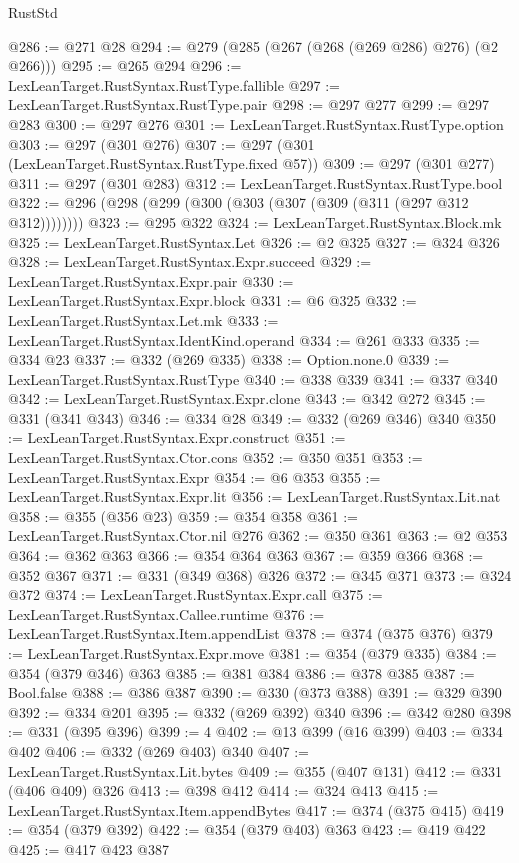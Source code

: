 \begin{lexlean}{RustStd}
\begin{coremodule}
@286 := @271 @28
@294 := @279 (@285 (@267 (@268 (@269 @286) @276) (@2 @266)))
@295 := @265 @294
@296 := LexLeanTarget.RustSyntax.RustType.fallible
@297 := LexLeanTarget.RustSyntax.RustType.pair
@298 := @297 @277
@299 := @297 @283
@300 := @297 @276
@301 := LexLeanTarget.RustSyntax.RustType.option
@303 := @297 (@301 @276)
@307 := @297 (@301 (LexLeanTarget.RustSyntax.RustType.fixed @57))
@309 := @297 (@301 @277)
@311 := @297 (@301 @283)
@312 := LexLeanTarget.RustSyntax.RustType.bool
@322 := @296 (@298 (@299 (@300 (@303 (@307 (@309 (@311 (@297 @312 @312))))))))
@323 := @295 @322
@324 := LexLeanTarget.RustSyntax.Block.mk
@325 := LexLeanTarget.RustSyntax.Let
@326 := @2 @325
@327 := @324 @326
@328 := LexLeanTarget.RustSyntax.Expr.succeed
@329 := LexLeanTarget.RustSyntax.Expr.pair
@330 := LexLeanTarget.RustSyntax.Expr.block
@331 := @6 @325
@332 := LexLeanTarget.RustSyntax.Let.mk
@333 := LexLeanTarget.RustSyntax.IdentKind.operand
@334 := @261 @333
@335 := @334 @23
@337 := @332 (@269 @335)
@338 := Option.none.{0}
@339 := LexLeanTarget.RustSyntax.RustType
@340 := @338 @339
@341 := @337 @340
@342 := LexLeanTarget.RustSyntax.Expr.clone
@343 := @342 @272
@345 := @331 (@341 @343)
@346 := @334 @28
@349 := @332 (@269 @346) @340
@350 := LexLeanTarget.RustSyntax.Expr.construct
@351 := LexLeanTarget.RustSyntax.Ctor.cons
@352 := @350 @351
@353 := LexLeanTarget.RustSyntax.Expr
@354 := @6 @353
@355 := LexLeanTarget.RustSyntax.Expr.lit
@356 := LexLeanTarget.RustSyntax.Lit.nat
@358 := @355 (@356 @23)
@359 := @354 @358
@361 := LexLeanTarget.RustSyntax.Ctor.nil @276
@362 := @350 @361
@363 := @2 @353
@364 := @362 @363
@366 := @354 @364 @363
@367 := @359 @366
@368 := @352 @367
@371 := @331 (@349 @368) @326
@372 := @345 @371
@373 := @324 @372
@374 := LexLeanTarget.RustSyntax.Expr.call
@375 := LexLeanTarget.RustSyntax.Callee.runtime
@376 := LexLeanTarget.RustSyntax.Item.appendList
@378 := @374 (@375 @376)
@379 := LexLeanTarget.RustSyntax.Expr.move
@381 := @354 (@379 @335)
@384 := @354 (@379 @346) @363
@385 := @381 @384
@386 := @378 @385
@387 := Bool.false
@388 := @386 @387
@390 := @330 (@373 @388)
@391 := @329 @390
@392 := @334 @201
@395 := @332 (@269 @392) @340
@396 := @342 @280
@398 := @331 (@395 @396)
@399 := 4
@402 := @13 @399 (@16 @399)
@403 := @334 @402
@406 := @332 (@269 @403) @340
@407 := LexLeanTarget.RustSyntax.Lit.bytes
@409 := @355 (@407 @131)
@412 := @331 (@406 @409) @326
@413 := @398 @412
@414 := @324 @413
@415 := LexLeanTarget.RustSyntax.Item.appendBytes
@417 := @374 (@375 @415)
@419 := @354 (@379 @392)
@422 := @354 (@379 @403) @363
@423 := @419 @422
@425 := @417 @423 @387

\end{coremodule}
\end{lexlean}
